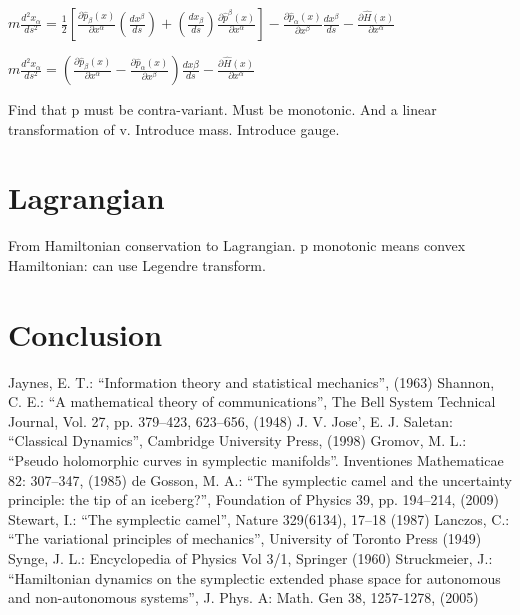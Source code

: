 \documentclass[aps,pra,10pt,twocolumn,floatfix,nofootinbib]{revtex4-1}
\theoremstyle{definition}
\begin{document}
$m\frac{d^2x_\alpha}{ds^2}=\frac{1}{2}[\frac{\partial\hat{p}_\beta(x)}{\partial x^\alpha} (\frac{dx^\beta}{ds}) + (\frac{dx_\beta}{ds})\frac{\partial\hat{p}^\beta(x)}{\partial x^\alpha} ]-\frac{\partial\hat{p}_\alpha(x)}{\partial x^\beta}\frac{dx^\beta}{ds}
-\frac{\partial \hat{H}(x)}{\partial x^\alpha}$

$m\frac{d^2x_\alpha}{ds^2}=(\frac{\partial\hat{p}_\beta(x)}{\partial x^\alpha} - \frac{\partial\hat{p}_\alpha(x)}{\partial x^\beta} ) \frac{dx\beta}{ds}
-\frac{\partial \hat{H}(x)}{\partial x^\alpha}$

Find that p must be contra-variant. Must be monotonic. And a linear transformation of v. Introduce mass. Introduce gauge.

\section{Lagrangian}

From Hamiltonian conservation to Lagrangian. p monotonic means convex Hamiltonian: can use Legendre transform.

\section{Conclusion}

\begin{thebibliography}{0}

 Jaynes, E. T.: ``Information theory and statistical mechanics'', (1963)
 Shannon, C. E.: ``A mathematical theory of communications'', The Bell System Technical Journal, Vol. 27, pp. 379–423, 623–656, (1948)
 J. V. Jose', E. J. Saletan: ``Classical Dynamics'', Cambridge University Press, (1998)
 Gromov, M. L.: ``Pseudo holomorphic curves in symplectic manifolds''. Inventiones Mathematicae 82: 307–347, (1985)
 de Gosson, M. A.: ``The symplectic camel and the uncertainty principle: the tip of an iceberg?'', Foundation of Physics 39, pp. 194–214, (2009)
 Stewart, I.: ``The symplectic camel'', Nature 329(6134), 17–18 (1987)
 Lanczos, C.: ``The variational principles of mechanics'', University of Toronto Press (1949)
 Synge, J. L.: Encyclopedia of Physics Vol 3/1, Springer (1960)
 Struckmeier, J.: ``Hamiltonian dynamics on the symplectic extended phase space for autonomous and non-autonomous systems'', J. Phys. A: Math. Gen 38, 1257-1278, (2005)

\end{thebibliography}
\end{document}
